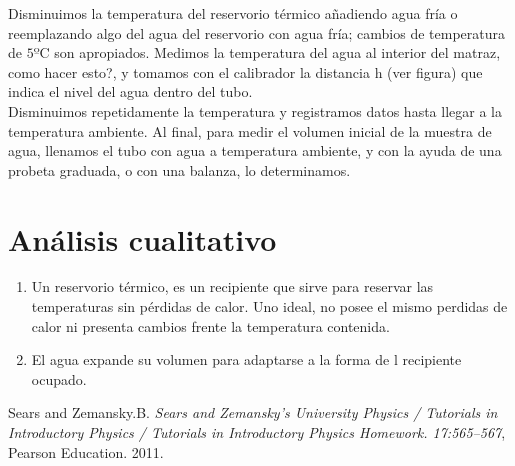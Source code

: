 \documentclass[DIV=calc, paper=a4, fontsize=11pt, twocolumn, spanish]{scrartcl}	 %
\begin{document}
Disminuimos la temperatura del reservorio térmico añadiendo agua fría o reemplazando algo del agua del reservorio con agua fría; cambios de temperatura de $5º$C son apropiados. Medimos la temperatura del agua al interior del matraz, como hacer esto?, y tomamos con el calibrador la distancia h (ver figura) que indica el nivel del agua dentro del tubo.\\

Disminuimos repetidamente la temperatura y registramos datos hasta llegar a la temperatura ambiente. Al final, para medir el volumen inicial de la muestra de agua, llenamos el tubo con agua a temperatura ambiente, y con la ayuda de una probeta graduada, o con una balanza, lo determinamos.

\section*{Análisis cualitativo}

\begin{enumerate}
\item Un reservorio térmico, es un recipiente que sirve para reservar las temperaturas sin pérdidas de calor. Uno ideal, no posee el mismo perdidas de calor ni presenta cambios frente la temperatura contenida.

\item El agua expande su volumen para adaptarse a la forma de 
l recipiente ocupado.
\end{enumerate}



\begin{thebibliography}{99} %

   Sears and Zemansky.B. {\em Sears and Zemansky's University Physics / Tutorials in Introductory Physics / Tutorials in Introductory Physics Homework. 17:565--567}, Pearson Education.  2011.
 
\end{thebibliography}

\end{document}
